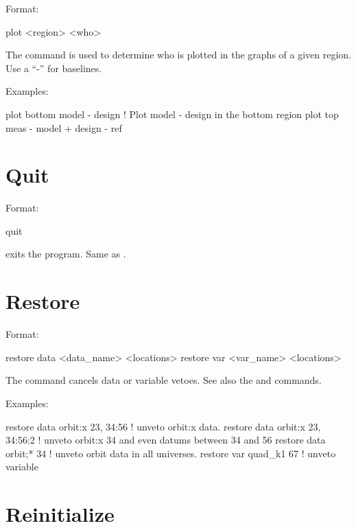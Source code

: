 Format:
\begin{example}
  plot <region> <who>
\end{example}

\vskip 0.2in 
The  command is used to determine who is plotted
in the graphs of a given region. Use a ``-'' for baselines. 

Examples:
\begin{example}
  plot bottom model - design       ! Plot model - design in the bottom region
  plot top meas - model + design - ref 
\end{example}

\section{Quit}
\label{s:quit}

Format:
\begin{example}
  quit
\end{example}

\vskip 0.2in
 exits the program. Same as .

\section{Restore}
\label{s:restore}

Format:
\begin{example}
  restore data  <data_name> <locations>
  restore var <var_name> <locations>
\end{example}

\vskip 0.2in 
The  command cancels data or variable
vetoes. See also the 
and  commands.

Examples:
\begin{example}
  restore data orbit:x  23, 34:56   ! unveto orbit:x data.
  restore data orbit:x  23, 34:56:2 ! unveto orbit:x 34 and even datums between
34 and 56
  restore data orbit;* 34           ! unveto orbit data in all universes.
  restore var quad_k1 67            ! unveto variable
\end{example}

\section{Reinitialize}
\label{s:reinit}

